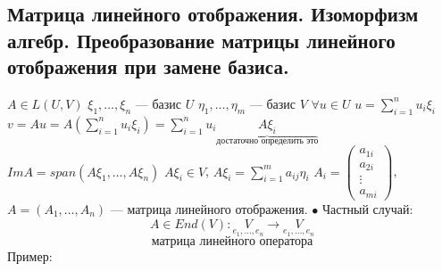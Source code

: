 \documentclass[12pt,a4paper]{article}
\begin{document}
\subsection{Матрица линейного отображения. Изоморфизм алгебр. Преобразование матрицы линейного отображения при замене базиса.}
$A \in L(U, V)$ \newline
$\xi_1, \ldots, \xi_n$ --- базис $U$ \newline
$\eta_1, \ldots, \eta_m$ --- базис $V$ \newline
$\forall u \in U$ $u = \sum\limits_{i=1}^{n} u_i \xi_i$ \newline
$v = Au = A(\sum\limits_{i=1}^{n} u_i \xi_i)=\sum\limits_{i=1}^{n} u_i \underset{\overbrace{\text{достаточно определить это}}}{A \xi_i}$ \newline
$Im A = span(A \xi_1, \ldots, A \xi_n)$ \newline
$A \xi_i \in V$, $A \xi_i = \sum\limits_{i=1}^{m} a_{ij} \eta_i$ \newline
$A_i = 
	\left( 
	\begin{matrix}
		a_{1i} \\
		a_{2i} \\
		\vdots \\
		a_{mi}
	\end{matrix} 
	\right)$, $A = (A_1, \ldots, A_n)$ --- матрица линейного отображения. \newline
$\bullet$ Частный случай: \newline
$$
	A \in End(V) : \underset{e_1, \ldots, e_n}{V} \rightarrow \underset{e_1, \ldots, e_n}{V}
$$
$$
	\text{матрица линейного оператора}
$$
Пример:
\end{document}
